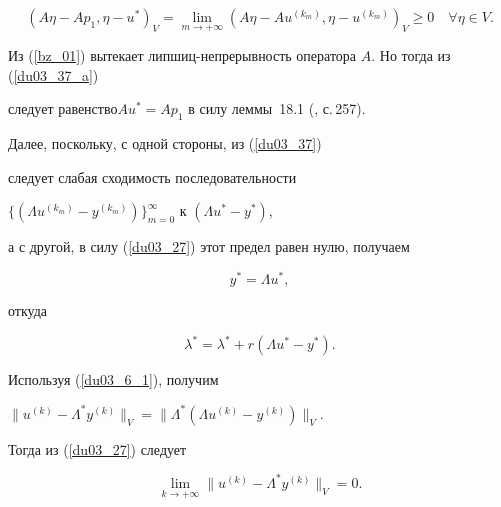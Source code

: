 \begin{pf}
\begin{equation}


(A \eta-A p_1, \eta-u^*)_V=\lim_{m \to+\infty} 


(A \eta-A u^{(k_m)}, \eta-u^{(k_m)})_V \geq 0 \quad \forall \eta \in V.


\label{du03_37_a}


\end{equation}


Из (\ref{bz_01}) вытекает липшиц-непрерывность оператора $A$. Но тогда из (\ref{du03_37_a})


следует равенство\linebreak $Au^*=A p_1$ в силу леммы~18.1 (\cite{Vain1972}, с.\,257). 





Далее, поскольку, с одной стороны, из (\ref{du03_37}) 


следует слабая сходимость последовательности 


$ \{(\Lambda u^{(k_m)}- y^{(k_m)}) \}_{m=0} ^{\infty}$ к $(\Lambda u^*- y^*) $,


а с другой, в силу (\ref{du03_27}) этот предел равен нулю, получаем 


\begin{equation}


y^*= \Lambda u^* ,


\label{du03_42}


\end{equation}


откуда


\begin{equation}


\lambda^*= \lambda^*+ r (\Lambda u^*-y^*) .


\label{du03_42_2}


\end{equation}


Используя (\ref{du03_6_1}), получим 


$ \| u^{(k)}-\Lambda^* y^{(k)} \|_V= \| \Lambda^* (\Lambda u^{(k)}-y^{(k)}) \|_V$.


Тогда из (\ref{du03_27}) следует


\begin{equation}


\lim_{k \to+\infty} \| u^{(k)}-\Lambda^* y^{(k)} \|_V =0 .


\label{du03_27_1}


\end{equation}






\end{pf}

